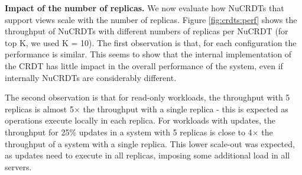 \documentclass[sigplan,twocolumn,review,anonymous]{acmart}
\begin{document}
\noindent
\textbf{Impact of the number of replicas.}
We now evaluate how NuCRDTs that support views scale with the number of replicas. 
Figure \ref{fig:crdts:perf} shows the throughput of NuCRDTs with different numbers of replicas per NuCRDT 
(for top K,  we used K = 10). 
The first observation is that, 
for each configuration the performance is similar.  This seems to show that the internal implementation of
the CRDT has little impact in the overall performance of the system, even if internally NuCRDTs are
considerably different.

The second observation is that for read-only workloads, the throughput with 5 replicas is almost 5$\times$
the throughput with a single replica - this is expected as operations execute locally in each replica. 
For workloads with updates, the throughput for 25\% updates in a system with 5 replicas is
close to 4$\times$ the
throughput of a system with a single replica. This lower scale-out was expected, as updates need to execute in all replicas,
imposing some additional load in all servers.


\end{document}

